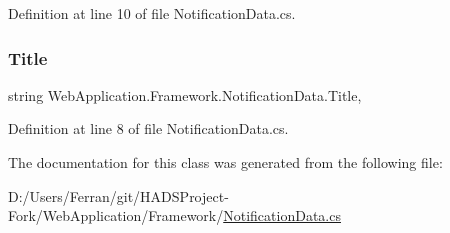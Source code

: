 Definition at line 10 of file Notification\+Data.\+cs.

\mbox{\label{classWebApplication_1_1Framework_1_1NotificationData_a4c00314a56a6d3bd97d52af56b783783}} 
\subsubsection{\texorpdfstring{Title}{Title}}
{\footnotesize\ttfamily string Web\+Application.\+Framework.\+Notification\+Data.\+Title\hspace{0.3cm}{\ttfamily [get]}, {\ttfamily [set]}}



Definition at line 8 of file Notification\+Data.\+cs.



The documentation for this class was generated from the following file\+:\begin{DoxyCompactItemize}
\item 
D\+:/\+Users/\+Ferran/git/\+H\+A\+D\+S\+Project-\/\+Fork/\+Web\+Application/\+Framework/\mbox{\hyperlink{NotificationData_8cs}{Notification\+Data.\+cs}}\end{DoxyCompactItemize}

